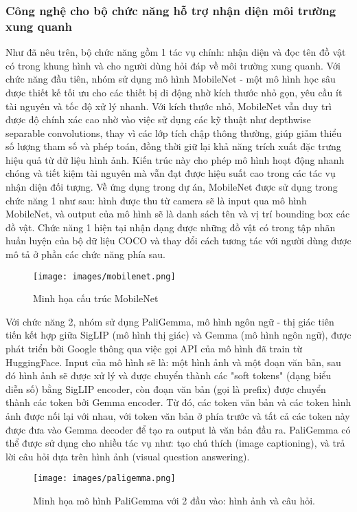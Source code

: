 \documentclass[a4paper,12pt]{article}
\begin{document}
\subsubsection{Công nghệ cho bộ chức năng hỗ trợ nhận diện môi trường xung quanh}
Như đã nêu trên, bộ chức năng gồm 1 tác vụ chính: nhận diện và đọc tên đồ vật có trong khung hình và cho người dùng hỏi đáp về môi trường xung quanh. Với chức năng đầu tiên, nhóm sử dụng mô hình MobileNet - một mô hình học sâu được thiết kế tối ưu cho các thiết bị di động nhờ kích thước nhỏ gọn, yêu cầu ít tài nguyên và tốc độ xử lý nhanh. Với kích thước nhỏ, MobileNet vẫn duy trì được độ chính xác cao nhờ vào việc sử dụng các kỹ thuật như depthwise separable convolutions, thay vì các lớp tích chập thông thường, giúp giảm thiểu số lượng tham số và phép toán, đồng thời giữ lại khả năng trích xuất đặc trưng hiệu quả từ dữ liệu hình ảnh. Kiến trúc này cho phép mô hình hoạt động nhanh chóng và tiết kiệm tài nguyên mà vẫn đạt được hiệu suất cao trong các tác vụ nhận diện đối tượng. Về ứng dụng trong dự án, MobileNet được sử dụng trong chức năng 1 như sau: hình được thu từ camera sẽ là input qua mô hình MobileNet, và output của mô hình sẽ là danh sách tên và vị trí bounding box các đồ vật. Chức năng 1 hiện tại nhận dạng được những đồ vật có trong tập nhãn huấn luyện của bộ dữ liệu COCO và thay đổi cách tương tác với người dùng được mô tả ở phần các chức năng phía sau.
\begin{figure}[H]
    \centering
    \texttt{[image: images/mobilenet.png]}
    \caption{Minh họa cấu trúc MobileNet}
    \label{fig:enter-label}
\end{figure}

Với chức năng 2, nhóm sử dụng PaliGemma, mô hình ngôn ngữ - thị giác tiên tiến kết hợp giữa SigLIP (mô hình thị giác) và Gemma (mô hình ngôn ngữ), được phát triển bởi Google thông qua việc gọi API của mô hình đã train từ HuggingFace. Input của mô hình sẽ là: một hình ảnh và một đoạn văn bản, sau đó hình ảnh sẽ được xử lý và được chuyển thành các "soft tokens" (dạng biểu diễn số) bằng SigLIP encoder, còn đoạn văn bản (gọi là prefix) được chuyển thành các token bởi Gemma encoder. Từ đó, các token văn bản và các token hình ảnh được nối lại với nhau, với token văn bản ở phía trước và tất cả các token này được đưa vào Gemma decoder để tạo ra output là văn bản đầu ra. PaliGemma có thể được sử dụng cho nhiều tác vụ như: tạo chú thích (image captioning), và trả lời câu hỏi dựa trên hình ảnh (visual question answering).

\begin{figure}[H]
    \centering
    \texttt{[image: images/paligemma.png]}
    \caption{Minh họa mô hình PaliGemma với 2 đầu vào: hình ảnh và câu hỏi.}
\end{figure}
\end{document}
